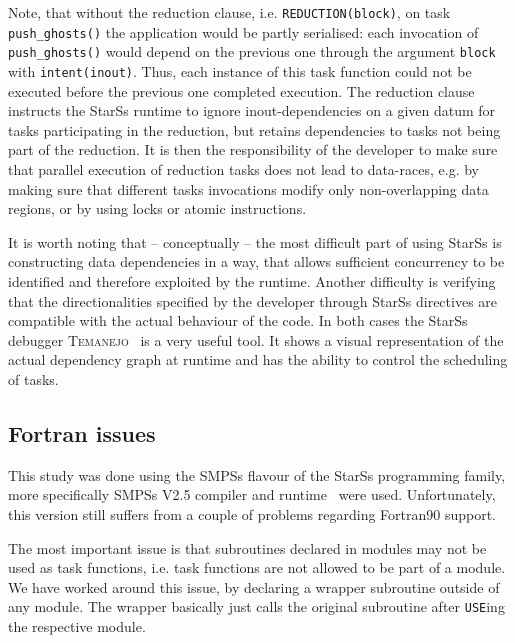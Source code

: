 \documentclass[conference]{IEEEtran}
\newcommand{\starss}{{StarSs}}
\newcommand{\smpss}{{SMPSs}}
\begin{document}
Note, that without the reduction clause,
i.e. \verb!REDUCTION(block)!,  on task \verb!push_ghosts()! the application
would be partly serialised: each invocation of \verb!push_ghosts()!
would depend on the previous one through the argument \verb!block!
with \verb!intent(inout)!. Thus, each instance of this task function
could not be executed before the previous one completed execution. The
reduction clause instructs the \starss{} runtime to ignore
inout-dependencies on a given datum for tasks participating in the
reduction, but retains dependencies to tasks not being part of the
reduction. It is then the responsibility of the developer to make sure
that parallel execution of reduction tasks does not lead to
data-races, e.g. by making sure that different tasks invocations modify only
non-overlapping data regions, or by using locks or atomic instructions.

It is worth noting that -- conceptually -- the most difficult part of
using \starss{} is constructing data dependencies in a way, that
allows sufficient concurrency to be identified and therefore exploited by the runtime. Another
difficulty is verifying that the directionalities specified by the
developer through \starss{} directives are compatible with the actual
behaviour of the code. In both cases the \starss{} debugger
\textsc{Temanejo}~\cite{BNGK11a,debugger:web} is a very
useful tool. It shows a visual representation of the actual dependency
graph at runtime and has the ability to control the scheduling of tasks.



\subsection{Fortran issues}
\label{sec:issues}

This study was done using the \smpss{} flavour of the \starss{}
programming family, more specifically \smpss{} V2.5 compiler
and runtime~\cite{*Ss:SMPSs25} were used. Unfortunately, this version still suffers
from a couple of problems regarding Fortran90 support. 

The most important issue is that subroutines declared in modules may not be
used as task functions, i.e. task functions are not allowed to be
part of a module. We have worked around this issue, by declaring a
wrapper subroutine outside of any module. The wrapper basically just
calls the original subroutine after \verb!USE!ing the respective
module.
\end{document}
